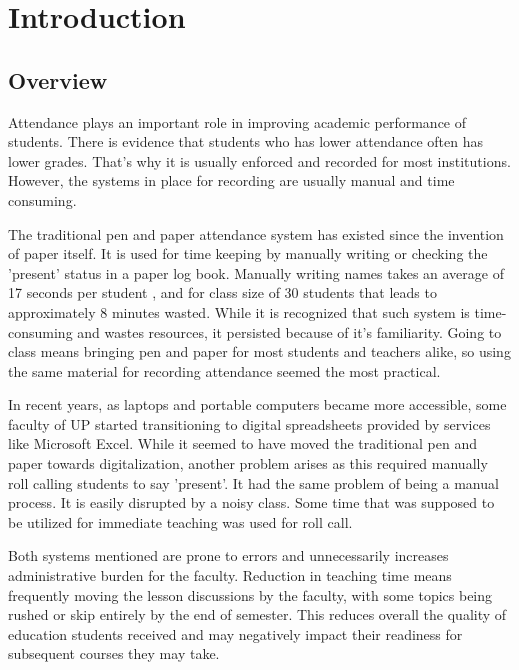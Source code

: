\chapter{Introduction}
\label{sec:researchdesc}    %

\section{Overview}
\label{sec:overview}

Attendance plays an important role in improving academic performance of students. There is evidence that students who has lower attendance often has lower grades\cite{EJES3887}. That's why it is usually enforced and recorded for most institutions. However, the systems in place for recording are usually manual and time consuming.

The traditional pen and paper attendance system has existed since the invention of paper itself. It is used for time keeping by manually writing or checking the 'present' status in a paper log book. Manually writing names takes an average of 17 seconds per student \cite{shoewu:2014}, and for class size of 30 students that leads to approximately 8 minutes wasted. While it is recognized that such system is time-consuming and wastes resources, it persisted because of it's familiarity. Going to class means bringing pen and paper for most students and teachers alike, so using the same material for recording attendance seemed the most practical.

In recent years, as laptops and portable computers became more accessible, some faculty of UP started transitioning to digital spreadsheets provided by services like Microsoft Excel. While it seemed to have moved the traditional pen and paper towards digitalization, another problem arises as this required manually roll calling students to say 'present'. It had the same problem of being a manual process. It is easily disrupted by a noisy class. Some time that was supposed to be utilized for immediate teaching was used for roll call.

Both systems mentioned are prone to errors and unnecessarily increases administrative burden for the faculty. Reduction in teaching time means frequently moving the lesson discussions by the faculty, with some topics being rushed or skip entirely by the end of semester. This reduces overall the quality of education students received and may negatively impact their readiness for subsequent courses they may take. 

